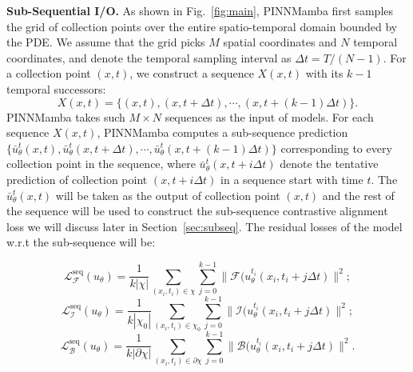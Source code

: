 \textbf{Sub-Sequential I/O.} As shown in Fig.~\ref{fig:main}, PINNMamba first samples the grid of collection points over the entire spatio-temporal domain bounded by the PDE. We assume that the grid picks $M$ spatial coordinates and $N$ temporal coordinates, and denote the temporal sampling interval as $\Delta t = T/(N-1)$. For a collection point $(x,t)$, we construct a sequence $X(x,t)$ with its $k-1$ temporal successors:  
\begin{equation}
    X(x,t) = \{(x,t),(x,t+\Delta t),\cdots,(x,t+(k-1)\Delta t)\}.
\end{equation}
PINNMamba takes such $M\times N$ sequences as the input of models. 
    For each sequence $X(x,t)$, PINNMamba computes a sub-sequence prediction $\{\bar u_\theta^t (x,t),\bar u_\theta^t (x,t+\Delta t),\cdots,\bar u_\theta^t (x,t+(k-1)\Delta t)\}$ corresponding to every collection point in the sequence, where $\bar u_\theta^t (x,t+i\Delta t)$ denote the tentative prediction of collection point $(x,t+i\Delta t)$ in a sequence start with time $t$. The $\bar u_\theta^t (x,t)$ will be taken as the output of collection point $(x,t)$ and the rest of the sequence will be used to construct the sub-sequence contrastive alignment loss we will discuss later in Section~\ref{sec:subseq}. The residual losses of the model w.r.t the sub-sequence will be:
    
\vspace{-5mm}

    \small{
    \begin{equation}
    \mathcal L_{\mathcal F}^\text{seq}(u_\theta)= \frac{1}{k|\chi|}\sum_{(x_i,t_i)\in \chi}\sum_{j=0}^{k-1}\|\mathcal F(u_\theta^{t_i}(x_i,t_i+j\Delta t)\|^2;
    \label{equ:lossequseq}
\end{equation}
\begin{equation}
    \mathcal L_{\mathcal I}^\text{seq}(u_\theta)= \frac{1}{k|\chi_0|}\sum_{(x_i,t_i)\in \chi_0}\sum_{j=0}^{k-1}\|\mathcal I(u_\theta^{t_i}(x_i,t_i+j\Delta t)\|^2;
    \label{equ:lossinitseq}
\end{equation}
\begin{equation}
    \mathcal L_{\mathcal B}^\text{seq}(u_\theta)= \frac{1}{k|\partial\chi|}\sum_{(x_i,t_i)\in \partial\chi}\sum_{j=0}^{k-1}\|\mathcal B(u_\theta^{t_i}(x_i,t_i+j\Delta t)\|^2.
    \label{equ:lossboundseq}
\end{equation}
}
\normalsize
\vspace{-5mm}

